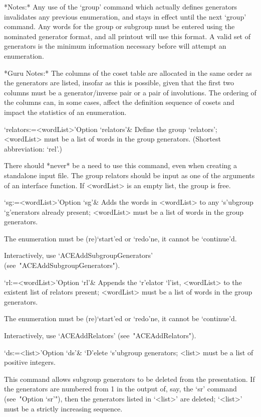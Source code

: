 *Notes:*
Any use of the  `group'  command  which  actually  defines  generators
invalidates any previous enumeration, and stays in  effect  until  the
next `group' command. Any words for the  group  or  subgroup  must  be
entered using the nominated generator format, and  all  printout  will
use this format. A valid set of generators is the minimum  information
necessary before {\ACE} will attempt an enumeration.

*Guru Notes:*
The columns of the coset table are allocated in the same order as  the
generators are listed, insofar as this is  possible,  given  that  the
first two columns must be  a  generator/inverse  pair  or  a  pair  of
involutions. The ordering of the columns can, in  some  cases,  affect
the definition sequence of cosets and  impact  the  statistics  of  an
enumeration.

\>`relators:=<wordList>'{Option `relators'}&
Define the group `relators'; <wordList> must be a list of words in the
group generators.
(Shortest abbreviation: `rel'.)

There should *never* be a need to use this command, even when creating
a standalone input file. The group relators should be input as one  of
the arguments of an {\ACE} interface function.  If  <wordList>  is  an
empty list, the group is free.

\>`sg:=<wordList>'{Option `sg'}&
Adds the words in <wordList> to any  `s'ubgroup  `g'enerators  already
present; <wordList> must be a list of words in the group generators.

The enumeration must  be  (re)`start'ed  or  `redo'ne,  it  cannot  be
`continue'd.

Interactively,             use              `ACEAddSubgroupGenerators'
(see~"ACEAddSubgroupGenerators").

\>`rl:=<wordList>'{Option `rl'}&
Appends the `r'elator `l'ist,  <wordList>  to  the  existent  list  of
relators present; <wordList> must be a list  of  words  in  the  group
generators.

The enumeration must  be  (re)`start'ed  or  `redo'ne,  it  cannot  be
`continue'd.

Interactively, use `ACEAddRelators' (see~"ACEAddRelators").

\>`ds:=<list>'{Option `ds'}&
`D'elete `s'ubgroup generators; <list> must  be  a  list  of  positive
integers.

This command  allows  subgroup  generators  to  be  deleted  from  the
presentation. If the generators are numbered from 1 in the output  of,
say, the `sr' command (see~"Option `sr'"), then the generators  listed
in `<list>' are  deleted;  `<list>'  must  be  a  strictly  increasing
sequence.


